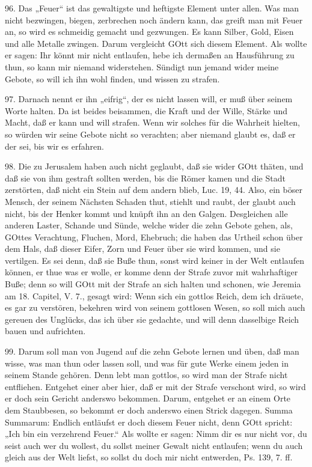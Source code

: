 96. Das „Feuer“ ist das gewaltigste und heftigste Element unter allen. Was man nicht bezwingen, biegen, zerbrechen noch ändern kann, das greift man mit Feuer an, so wird es schmeidig gemacht und gezwungen. Es kann Silber, Gold, Eisen und alle Metalle zwingen. Darum vergleicht GOtt sich diesem Element. Als wollte er sagen: Ihr könnt mir nicht entlaufen, hebe ich dermaßen an Hausführung zu thun, so kann mir niemand widerstehen. Sündigt nun jemand wider meine Gebote, so will ich ihn wohl finden, und wissen zu strafen.

97. Darnach nennt er ihn „eifrig“, der es nicht lassen will, er muß über seinem Worte halten. Da ist beides beisammen, die Kraft und der Wille, Stärke und Macht, daß er kann und will strafen. Wenn wir solches für die Wahrheit hielten, so würden wir seine Gebote nicht so verachten; aber niemand glaubt es, daß er der sei, bis wir es erfahren.

98. Die zu Jerusalem haben auch nicht geglaubt, daß sie wider GOtt thäten, und daß sie von ihm gestraft sollten werden, bis die Römer kamen und die Stadt zerstörten, daß nicht ein Stein auf dem andern blieb, Luc. 19, 44. Also, ein böser Mensch, der seinem Nächsten Schaden thut, stiehlt und raubt, der glaubt auch nicht, bis der Henker kommt und knüpft ihn an den Galgen. Desgleichen alle anderen Laster, Schande und Sünde, welche wider die zehn Gebote gehen, als, GOttes Verachtung, Fluchen, Mord, Ehebruch; die haben das Urtheil schon über dem Hals, daß dieser Eifer, Zorn und Feuer über sie wird kommen, und sie vertilgen. Es sei denn, daß sie Buße thun, sonst wird keiner in der Welt entlaufen können, er thue was er wolle, er komme denn der Strafe zuvor mit wahrhaftiger Buße; denn so will GOtt mit der Strafe an sich halten und schonen, wie Jeremia am 18. Capitel, V. 7., gesagt wird: Wenn sich ein gottlos Reich, dem ich dräuete, es gar zu verstören, bekehren wird von seinem gottlosen Wesen, so soll mich auch gereuen des Unglücks, das ich über sie gedachte, und will denn dasselbige Reich bauen und aufrichten.

99. Darum soll man von Jugend auf die zehn Gebote lernen und üben, daß man wisse, was man thun oder lassen soll, und was für gute Werke einem jeden in seinem Stande gehören. Denn lebt man gottlos, so wird man der Strafe nicht entfliehen. Entgehet einer aber hier, daß er mit der Strafe verschont wird, so wird er doch sein Gericht anderswo bekommen. Darum, entgehet er an einem Orte dem Staubbesen, so bekommt er doch anderswo einen Strick dagegen. Summa Summarum: Endlich entläufst er doch diesem Feuer nicht, denn GOtt spricht: „Ich bin ein verzehrend Feuer.“ Als wollte er sagen: Nimm dir es nur nicht vor, du seist auch wer du wollest, du sollst meiner Gewalt nicht entlaufen; wenn du auch gleich aus der Welt liefst, so sollst du doch mir nicht entwerden, Ps. 139, 7. ff.


